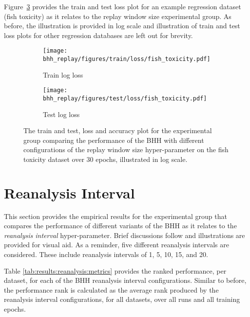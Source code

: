 Figure~\ref{fig:results:replay:figures:fish_toxicity} provides the train and test loss plot for an example regression dataset (fish toxicity) as it relates to the replay window size experimental group. As before, the illustration is provided in log scale and illustration of train and test loss plots for other regression databases are left out for brevity.

\begin{figure}[H]
	\begin{subfigure}{0.5\textwidth}
		\centering
		\texttt{[image: bhh\_replay/figures/train/loss/fish\_toxicity.pdf]}
		\caption{Train log loss}
		\label{fig:results:replay:figures:loss:train:fish_toxicity}
	\end{subfigure}
	\begin{subfigure}{0.5\textwidth}
		\centering
		\texttt{[image: bhh\_replay/figures/test/loss/fish\_toxicity.pdf]}
		\caption{Test log loss}
		\label{fig:results:replay:figures:loss:test:fish_toxicity}
	\end{subfigure}
	\par\bigskip
	\caption{The train and test, loss and accuracy plot for the experimental group comparing the performance of the \acs{BHH} with different configurations of the replay window size hyper-parameter on the fish toxicity dataset over 30 epochs, illustrated in log scale.}
	\label{fig:results:replay:figures:fish_toxicity}
\end{figure}



\section{Reanalysis Interval}\label{sec:results:reanalysis}

This section provides the empirical results for the experimental group that compares the performance of different variants of the \acs{BHH} as it relates to the \textit{reanalysis interval} hyper-parameter. Brief discussions follow and illustrations are provided for visual aid. As a reminder, five different reanalysis intervals are considered. These include reanalysis intervals of 1, 5, 10, 15, and 20.

Table \ref{tab:results:reanalysis:metrics} provides the ranked performance, per dataset, for each of the \acs{BHH} reanalysis interval configurations. Similar to before, the performance rank is calculated as the average rank produced by the reanalysis interval configurations, for all datasets, over all runs and all training epochs.

